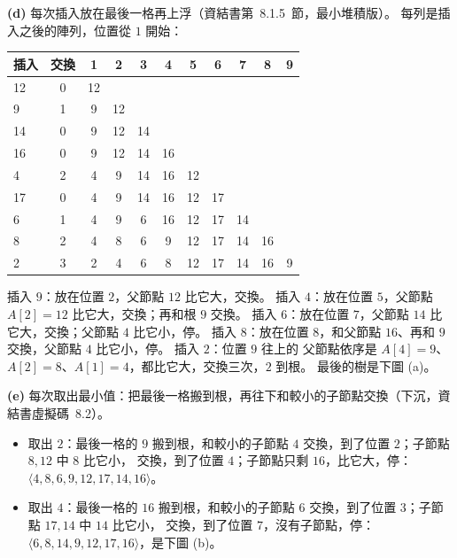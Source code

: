 \begin{pastsoln}
\textbf{(d)} 每次插入放在最後一格再上浮（資結書第~8.1.5~節，最小堆積版）。 每列是插入之後的陣列，位置從
$1$ 開始：
\begin{center}
\small
\begin{tabular}{lc*{9}{c}}
\toprule
插入 & 交換 & 1 & 2 & 3 & 4 & 5 & 6 & 7 & 8 & 9 \\
\midrule
12 & 0 & 12 \\
9 & 1 & 9 & 12 \\
14 & 0 & 9 & 12 & 14 \\
16 & 0 & 9 & 12 & 14 & 16 \\
4 & 2 & 4 & 9 & 14 & 16 & 12 \\
17 & 0 & 4 & 9 & 14 & 16 & 12 & 17 \\
6 & 1 & 4 & 9 & 6 & 16 & 12 & 17 & 14 \\
8 & 2 & 4 & 8 & 6 & 9 & 12 & 17 & 14 & 16 \\
2 & 3 & 2 & 4 & 6 & 8 & 12 & 17 & 14 & 16 & 9 \\
\bottomrule
\end{tabular}
\end{center}
插入 $9$：放在位置 $2$，父節點 $12$ 比它大，交換。 插入 $4$：放在位置 $5$，父節點 $A[2] = 12$ 比它大，交換；再和根 $9$ 交換。
插入 $6$：放在位置 $7$，父節點 $14$ 比它大，交換；父節點 $4$ 比它小，停。
插入 $8$：放在位置 $8$，和父節點 $16$、再和 $9$ 交換，父節點 $4$ 比它小，停。 插入 $2$：位置 $9$ 往上的
父節點依序是 $A[4] = 9$、$A[2] = 8$、$A[1] = 4$，都比它大，交換三次，$2$ 到根。 最後的樹是下圖 (a)。

\textbf{(e)} 每次取出最小值：把最後一格搬到根，再往下和較小的子節點交換（下沉，資結書虛擬碼~8.2）。
\begin{itemize}
\item 取出 $2$：最後一格的 $9$ 搬到根，和較小的子節點 $4$ 交換，到了位置 $2$；子節點 $8, 12$ 中 $8$ 比它小，
交換，到了位置 $4$；子節點只剩 $16$，比它大，停：$\langle 4, 8, 6, 9, 12, 17, 14, 16 \rangle$。
\item 取出 $4$：最後一格的 $16$ 搬到根，和較小的子節點 $6$ 交換，到了位置 $3$；子節點 $17, 14$ 中 $14$ 比它小，
交換，到了位置 $7$，沒有子節點，停：$\langle 6, 8, 14, 9, 12, 17, 16 \rangle$，是下圖 (b)。
\end{itemize}
\begin{center}
\begin{minipage}{0.5\linewidth}\centering
{}


\end{minipage}
\end{center}
\end{pastsoln}

